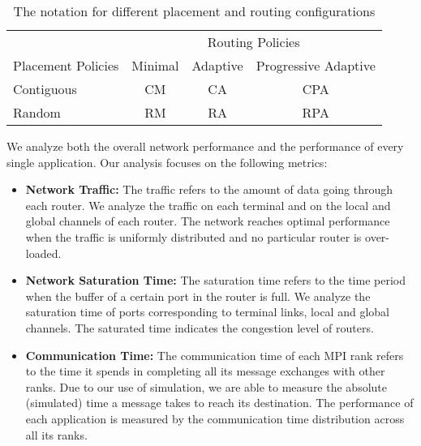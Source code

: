 
\begin{table}[ht]
\begin{center}
\caption{The notation for different placement and routing configurations} 
\label{tab: placement routing configs}
\begin{tabular}{l c c c }
\toprule %
\toprule
&\multicolumn{3}{c}{Routing Policies} \\ 
\cmidrule(l){2-4}
Placement Policies & Minimal & Adaptive & Progressive Adaptive\\ %
\midrule %
Contiguous  &  CM   &   CA   &  CPA   \\ %
\midrule
Random  &   RM  &   RA   &  RPA   \\ 
\midrule %
\bottomrule %
\end{tabular}
\end{center}
\end{table}


We analyze both the overall network performance and the performance of every single application.
Our analysis focuses on the following metrics:
\begin{itemize}

    \item \textbf{Network Traffic:} The traffic refers to the amount of data going through each router. We analyze the traffic on each terminal and on the local and global channels of each router. The network reaches optimal performance when the traffic is uniformly distributed and no particular router is over-loaded. 
            
    \item \textbf{Network Saturation Time:} The saturation time refers to the time period when the buffer of a certain port in the router is full. We analyze the saturation time of ports corresponding to terminal links, local and global channels. The saturated time indicates the congestion level of routers. 
    
    \item \textbf{Communication Time:} The communication time of each MPI rank refers to the time it spends in completing all its message exchanges with other ranks. Due to our use of simulation, we are able to measure the absolute (simulated) time a message takes to reach its destination. The performance of each application is measured by the communication time distribution across all its ranks.    
    
    \end{itemize}

